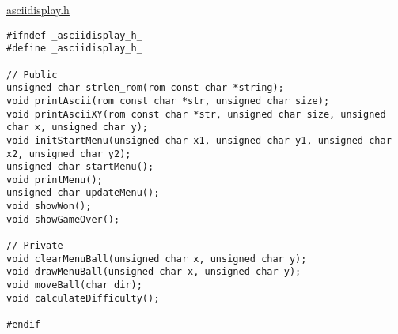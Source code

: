 \underline{asciidisplay.h}
\begin{lstlisting}
#ifndef _asciidisplay_h_
#define _asciidisplay_h_

// Public
unsigned char strlen_rom(rom const char *string);
void printAscii(rom const char *str, unsigned char size);
void printAsciiXY(rom const char *str, unsigned char size, unsigned char x, unsigned char y);
void initStartMenu(unsigned char x1, unsigned char y1, unsigned char x2, unsigned char y2);
unsigned char startMenu();
void printMenu();
unsigned char updateMenu();
void showWon();
void showGameOver();

// Private
void clearMenuBall(unsigned char x, unsigned char y);
void drawMenuBall(unsigned char x, unsigned char y);
void moveBall(char dir);
void calculateDifficulty();

#endif
\end{lstlisting}


